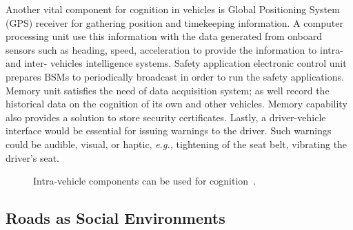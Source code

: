 \documentclass[journal, 11pt]{IEEEtran}
\begin{document}
Another vital component for cognition in vehicles is Global Positioning System
(GPS) receiver for gathering position and timekeeping information. A computer
processing unit use this information with the data generated from onboard
sensors such as heading, speed, acceleration to provide the information to
intra- and inter- vehicles intelligence systems. Safety application electronic
control unit prepares BSMs to periodically broadcast in order to run the safety
applications. Memory unit satisfies the need of data acquisition system; as well
record the historical data on the cognition of its own and other vehicles.
Memory capability also provides a solution to store security certificates.
Lastly, a driver-vehicle interface would be essential for issuing warnings to
the driver. Such warnings could be audible, visual, or haptic, \textit{e.g.,}
tightening of the seat belt, vibrating the driver's seat.

\begin{figure}[!t]
\centerline{}
\vspace{-5pt}
\caption{Intra-vehicle components can be used for
cognition~\cite{hardingNHTSA14}.}\label{fig:invehComp}
\vspace{-15pt}
\end{figure}

\subsection{Roads as Social Environments}
\end{document}
